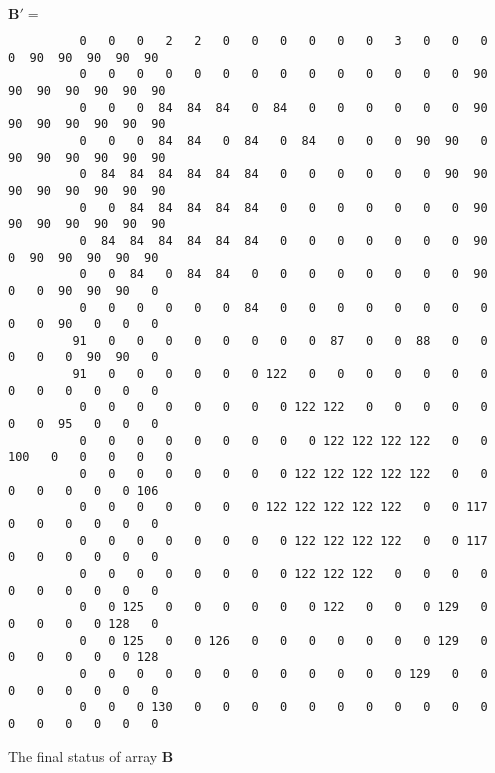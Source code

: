 \begin{listado}                                                                                
$\mathbf{B}' = $                                                                               
\tiny                                                                                          
\begin{verbatim}                                                                               
          0   0   0   2   2   0   0   0   0   0   0   3   0   0   0   0  90  90  90  90  90
          0   0   0   0   0   0   0   0   0   0   0   0   0   0  90  90  90  90  90  90  90
          0   0   0  84  84  84   0  84   0   0   0   0   0   0  90  90  90  90  90  90  90
          0   0   0  84  84   0  84   0  84   0   0   0  90  90   0  90  90  90  90  90  90
          0  84  84  84  84  84  84   0   0   0   0   0   0  90  90  90  90  90  90  90  90
          0   0  84  84  84  84  84   0   0   0   0   0   0   0  90  90  90  90  90  90  90
          0  84  84  84  84  84  84   0   0   0   0   0   0   0  90   0  90  90  90  90  90
          0   0  84   0  84  84   0   0   0   0   0   0   0   0  90   0   0  90  90  90   0
          0   0   0   0   0   0  84   0   0   0   0   0   0   0   0   0   0  90   0   0   0
         91   0   0   0   0   0   0   0   0  87   0   0  88   0   0   0   0   0  90  90   0
         91   0   0   0   0   0   0 122   0   0   0   0   0   0   0   0   0   0   0   0   0
          0   0   0   0   0   0   0   0 122 122   0   0   0   0   0   0   0  95   0   0   0
          0   0   0   0   0   0   0   0   0 122 122 122 122   0   0 100   0   0   0   0   0
          0   0   0   0   0   0   0   0 122 122 122 122 122   0   0   0   0   0   0   0 106
          0   0   0   0   0   0   0 122 122 122 122 122   0   0 117   0   0   0   0   0   0
          0   0   0   0   0   0   0   0 122 122 122 122   0   0 117   0   0   0   0   0   0
          0   0   0   0   0   0   0   0 122 122 122   0   0   0   0   0   0   0   0   0   0
          0   0 125   0   0   0   0   0   0 122   0   0   0 129   0   0   0   0   0 128   0
          0   0 125   0   0 126   0   0   0   0   0   0   0 129   0   0   0   0   0   0 128
          0   0   0   0   0   0   0   0   0   0   0   0 129   0   0   0   0   0   0   0   0
          0   0   0 130   0   0   0   0   0   0   0   0   0   0   0   0   0   0   0   0   0            
\end{verbatim}
\caption{The final status of array $\mathbf{B}$}
\label{lis:arraybb}
\end{listado}


